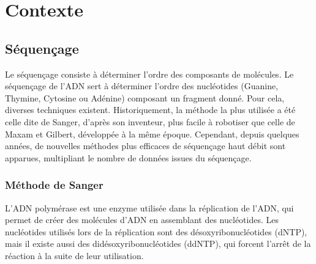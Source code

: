 \section{Contexte}

%
%
%
%


\subsection{Séquençage}
Le séquençage consiste à déterminer l'ordre des composants de molécules. Le séquençage de l'ADN sert à déterminer l'ordre des nucléotides (Guanine, Thymine, Cytosine ou Adénine) composant un fragment donné. Pour cela, diverses techniques existent. Historiquement, la méthode la plus utilisée a été celle dite de Sanger, d'après son inventeur, plus facile à robotiser que celle de Maxam et Gilbert, développée à la même époque. Cependant, depuis quelques années, de nouvelles méthodes plus efficaces de séquençage haut débit sont apparues, multipliant le nombre de données issues du séquençage.

\subsubsection{Méthode de Sanger}
L'ADN polymérase est une enzyme utilisée dans la réplication de l'ADN, qui permet de créer des molécules d'ADN en assemblant des nucléotides. Les nucléotides utilisés lors de la réplication sont des désoxyribonucléotides (dNTP), mais il existe aussi des didésoxyribonucléotides (ddNTP), qui forcent l’arrêt de la réaction à la suite de leur utilisation. 

